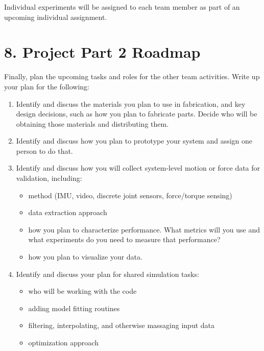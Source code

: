 \documentclass[12pt]{article}
\begin{document}
\noindent Individual experiments will be assigned to each team member as part of an upcoming individual assignment.


\section*{8. Project Part 2 Roadmap}
Finally, plan the upcoming tasks and roles for the other team activities. Write up your plan for the following:
\begin{enumerate}
    \item Identify and discuss the materials you plan to use in fabrication, and key design decisions, such as how you plan to fabricate parts. Decide who will be obtaining those materials and distributing them.
    
    \item Identify and discuss how you plan to prototype your system and assign one person to do that.
    
    \item Identify and discuss how you will collect system-level motion or force data for validation, including:
    \begin{itemize}
        \item method (IMU, video, discrete joint sensors, force/torque sensing)
        \item data extraction approach
        \item how you plan to characterize performance. What metrics will you use and what experiments do you need to measure that performance?
        \item how you plan to visualize your data.
    \end{itemize}
    
    \begin{center}
    \end{center}
    
    \item Identify and discuss your plan for shared simulation tasks:
    \begin{itemize}
        \item who will be working with the code
        \item adding model fitting routines
        \item filtering, interpolating, and otherwise massaging input data
        \item optimization approach
    \end{itemize}
    

\end{enumerate}
\end{document}
